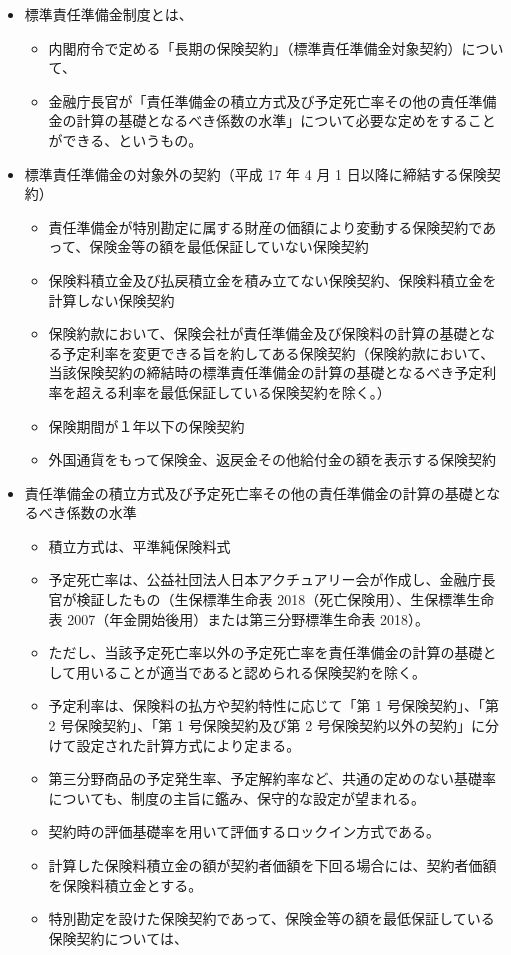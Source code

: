 \documentclass[report,gutter=10mm,fore-edge=10mm,uplatex,dvipdfmx]{jlreq}
\begin{document}
\begin{itemize}
\tightlist
\item
  標準責任準備金制度とは、

  \begin{itemize}
  \tightlist
  \item
    内閣府令で定める「長期の保険契約」（標準責任準備金対象契約）について、
  \item
    金融庁長官が「責任準備金の積立方式及び予定死亡率その他の責任準備金の計算の基礎となるべき係数の水準」について必要な定めをすることができる、というもの。
  \end{itemize}
\item
  標準責任準備金の対象外の契約（平成 17 年 4 月 1
  日以降に締結する保険契約）

  \begin{itemize}
  \tightlist
  \item
    責任準備金が特別勘定に属する財産の価額により変動する保険契約であって、保険金等の額を最低保証していない保険契約
  \item
    保険料積立金及び払戻積立金を積み立てない保険契約、保険料積立金を計算しない保険契約
  \item
    保険約款において、保険会社が責任準備金及び保険料の計算の基礎となる予定利率を変更できる旨を約してある保険契約（保険約款において、当該保険契約の締結時の標準責任準備金の計算の基礎となるべき予定利率を超える利率を最低保証している保険契約を除く。）
  \item
    保険期間が１年以下の保険契約
  \item
    外国通貨をもって保険金、返戻金その他給付金の額を表示する保険契約
  \end{itemize}
\item
  責任準備金の積立方式及び予定死亡率その他の責任準備金の計算の基礎となるべき係数の水準

  \begin{itemize}
  \tightlist
  \item
    積立方式は、平準純保険料式
  \item
    予定死亡率は、公益社団法人日本アクチュアリー会が作成し、金融庁長官が検証したもの（生保標準生命表
    2018（死亡保険用）、生保標準生命表
    2007（年金開始後用）または第三分野標準生命表 2018）。
  \item
    ただし、当該予定死亡率以外の予定死亡率を責任準備金の計算の基礎として用いることが適当であると認められる保険契約を除く。
  \item
    予定利率は、保険料の払方や契約特性に応じて「第 1 号保険契約」、「第
    2 号保険契約」、「第 1 号保険契約及び第 2
    号保険契約以外の契約」に分けて設定された計算方式により定まる。
  \item
    第三分野商品の予定発生率、予定解約率など、共通の定めのない基礎率についても、制度の主旨に鑑み、保守的な設定が望まれる。
  \item
    契約時の評価基礎率を用いて評価するロックイン方式である。
  \item
    計算した保険料積立金の額が契約者価額を下回る場合には、契約者価額を保険料積立金とする。
  \item
    特別勘定を設けた保険契約であって、保険金等の額を最低保証している保険契約については、


\end{itemize}
\end{itemize}
\end{document}
